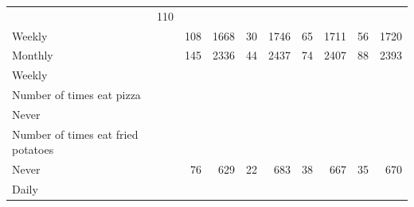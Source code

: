 \documentclass{article}
\begin{document}
\begin{table}[!h]
{\begin{tabular}{lllllllll}
			\multicolumn{1}{r}{110} \\
			\multicolumn{1}{l}{\hspace{5em}Weekly} &
			\multicolumn{1}{|r}{108} &
			\multicolumn{1}{r}{1668} &
			\multicolumn{1}{r}{30} &
			\multicolumn{1}{r}{1746} &
			\multicolumn{1}{r}{65} &
			\multicolumn{1}{r}{1711} &
			\multicolumn{1}{r}{56} &
			\multicolumn{1}{r}{1720} \\
			\multicolumn{1}{l}{\hspace{5em}Monthly} &
			\multicolumn{1}{|r}{145} &
			\multicolumn{1}{r}{2336} &
			\multicolumn{1}{r}{44} &
			\multicolumn{1}{r}{2437} &
			\multicolumn{1}{r}{74} &
			\multicolumn{1}{r}{2407} &
			\multicolumn{1}{r}{88} &
			\multicolumn{1}{r}{2393} \\
			\multicolumn{1}{l}{\hspace{1em}Weekly} &
			\multicolumn{1}{|r}{} &
			\multicolumn{1}{r}{} &
			\multicolumn{1}{r}{} &
			\multicolumn{1}{r}{} &
			\multicolumn{1}{r}{} &
			\multicolumn{1}{r}{} &
			\multicolumn{1}{r}{} &
			\multicolumn{1}{r}{} \\
			\multicolumn{1}{l}{\hspace{2em}Number of times eat pizza} &
			\multicolumn{1}{|r}{} &
			\multicolumn{1}{r}{} &
			\multicolumn{1}{r}{} &
			\multicolumn{1}{r}{} &
			\multicolumn{1}{r}{} &
			\multicolumn{1}{r}{} &
			\multicolumn{1}{r}{} &
			\multicolumn{1}{r}{} \\
			\multicolumn{1}{l}{\hspace{3em}Never} &
			\multicolumn{1}{|r}{} &
			\multicolumn{1}{r}{} &
			\multicolumn{1}{r}{} &
			\multicolumn{1}{r}{} &
			\multicolumn{1}{r}{} &
			\multicolumn{1}{r}{} &
			\multicolumn{1}{r}{} &
			\multicolumn{1}{r}{} \\
			\multicolumn{1}{l}{\hspace{4em}Number of times eat fried potatoes} &
			\multicolumn{1}{|r}{} &
			\multicolumn{1}{r}{} &
			\multicolumn{1}{r}{} &
			\multicolumn{1}{r}{} &
			\multicolumn{1}{r}{} &
			\multicolumn{1}{r}{} &
			\multicolumn{1}{r}{} &
			\multicolumn{1}{r}{} \\
			\multicolumn{1}{l}{\hspace{5em}Never} &
			\multicolumn{1}{|r}{76} &
			\multicolumn{1}{r}{629} &
			\multicolumn{1}{r}{22} &
			\multicolumn{1}{r}{683} &
			\multicolumn{1}{r}{38} &
			\multicolumn{1}{r}{667} &
			\multicolumn{1}{r}{35} &
			\multicolumn{1}{r}{670} \\
			\multicolumn{1}{l}{\hspace{5em}Daily} &

\end{tabular}}
\end{table}
\end{document}
